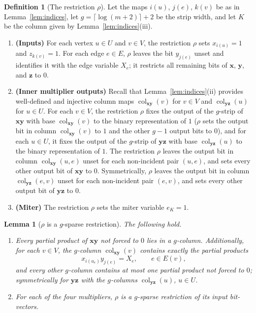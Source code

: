 \documentclass[11pt]{article}
\newtheorem{lemma}[theorem]{Lemma}
\theoremstyle{definition}
\newtheorem{definition}[theorem]{Definition}
\theoremstyle{remark}
\newcommand{\col}{\operatorname{col}}
\newcommand{\vv}[1]{\mathbf{#1}}
\begin{document}
\begin{definition}[The restriction $\rho$]
\label{def:rho}
Let the maps $i(u)$, $j(e)$, $k(v)$ be as in Lemma~\ref{lem:indices}, let $g=\lceil\log(m+2)\rceil+2$ be the strip width, and let $K$ be
the column given by Lemma~\ref{lem:indices}(iii).
\begin{enumerate}[label=(\alph*)]
\item \textbf{(Inputs)} For each vertex $u\in U$ and $v\in V$, the restriction $\rho$ sets
$x_{i(u)}=1$ and $z_{k(v)}=1$. For each edge $e\in E$, $\rho$ leaves the bit $y_{j(e)}$
unset and identifies it with the edge variable $X_e$; it restricts all
remaining bits of $\vv{x}$, $\vv{y}$, and $\vv{z}$ to $0$.
\item \textbf{(Inner multiplier outputs)} Recall that Lemma~\ref{lem:indices}(ii) provides well-defined and injective column maps
$\col_{\vv{xy}}(v)$ for $v\in V$ and $\col_{\vv{yz}}(u)$ for $u\in U$.
For each $v\in V$, the restriction $\rho$ fixes the output of the $g$-strip of $\vv{x}\vv{y}$ with base $\col_{\vv{xy}}(v)$ to the binary representation of
$1$ ($\rho$ sets the output bit in column $\col_{\vv{xy}}(v)$ to $1$ and the other $g-1$ output bits to $0$), and for each $u\in U$, it
fixes the output of the $g$-strip of $\vv{y}\vv{z}$ with base $\col_{\vv{yz}}(u)$ to the binary representation of $1$. The restriction $\rho$ leaves the output bit in column $\col_{\vv{xy}}(u,e)$ unset for each non-incident pair $(u,e)$, and sets every other output
bit of $\vv{x}\vv{y}$ to $0$. Symmetrically, $\rho$ leaves the output bit in column
$\col_{\vv{yz}}(e,v)$ unset for each non-incident pair $(e,v)$, and sets every other output bit of $\vv{y}\vv{z}$ to $0$.
\item \textbf{(Miter)} The restriction $\rho$ sets the miter variable $e_K=1$.
\end{enumerate}
\end{definition}

\begin{lemma}[$\rho$ is a $g$-sparse restriction]
\label{lem:rho-g-sparse}
The following hold.
\begin{enumerate}[label=(\roman*)]
\item Every partial product of $\vv{x}\vv{y}$ not forced to $0$ lies in a $g$-column. Additionally, for each $v\in V$, the $g$-column $\col_{\vv{xy}}(v)$
contains exactly the partial products
\[
x_{i(u_e)}y_{j(e)}=X_e,\qquad e\in E(v),
\]
and every other $g$-column contains at most one partial product not forced to $0$; symmetrically for $\vv{y}\vv{z}$ with the $g$-columns
$\col_{\vv{yz}}(u)$, $u\in U$.
\item For each of the four multipliers, $\rho$ is a $g$-sparse restriction of its input bit-vectors.
\end{enumerate}
\end{lemma}
\end{document}
